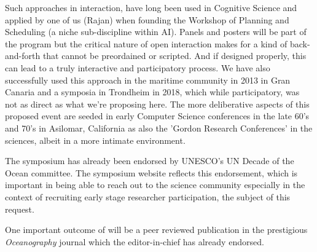 \noindent
Such approaches in interaction, have long been used in Cognitive
Science and applied by one of us (Rajan) when founding the \nas
Workshop of Planning and Scheduling (a niche sub-discipline within
AI). Panels and posters will be part of the program but the critical
nature of open interaction makes for a kind of back-and-forth that
cannot be preordained or scripted. And if designed properly, this can
lead to a truly interactive and participatory process. We have also
successfully used this approach in the maritime community in 2013 in
Gran Canaria and a symposia in Trondheim in 2018, which while
participatory, was not as direct as what we're proposing here. The
more deliberative aspects of this proposed event are seeded in early
Computer Science conferences in the late 60's and 70's in Asilomar,
California as also the 'Gordon Research Conferences' in the sciences,
albeit in a more intimate environment.

The symposium has already been endorsed by UNESCO's UN Decade of the
Ocean committee. The symposium website reflects this endorsement,
which is important in being able to reach out to the science community
especially in the context of recruiting early stage researcher
participation, the subject of this request.

One important outcome of \symp will be a peer reviewed publication in
the prestigious \emph{Oceanography} journal which the editor-in-chief
has already endorsed.
